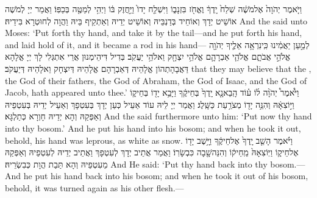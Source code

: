 {וַיֹּ֤אמֶר יְהֹוָה֙ אֶל\maqqaf מֹשֶׁ֔ה שְׁלַח֙ יָֽדְךָ֔ וֶאֱחֹ֖ז בִּזְנָב֑וֹ וַיִּשְׁלַ֤ח יָדוֹ֙ וַיַּ֣חֲזֶק בּ֔וֹ וַיְהִ֥י לְמַטֶּ֖ה בְּכַפּֽוֹ׃}
{וַאֲמַר יְיָ לְמֹשֶׁה אוֹשֵׁיט יְדָךְ וְאוֹחֵיד בְּדַנְבֵּיהּ וְאוֹשֵׁיט יְדֵיהּ וְאַתְקֵיף בֵּיהּ וַהֲוָה לְחוּטְרָא בִּידֵיהּ׃}
{And the \lord\space said unto Moses: ‘Put forth thy hand, and take it by the tail—and he put forth his hand, and laid hold of it, and it became a rod in his hand—}{}
{לְמַ֣עַן יַאֲמִ֔ינוּ כִּֽי\maqqaf נִרְאָ֥ה אֵלֶ֛יךָ יְהֹוָ֖ה אֱלֹהֵ֣י אֲבֹתָ֑ם אֱלֹהֵ֧י אַבְרָהָ֛ם אֱלֹהֵ֥י יִצְחָ֖ק וֵאלֹהֵ֥י יַעֲקֹֽב׃}
{בְּדִיל דִּיהֵימְנוּן אֲרֵי אִתְגְּלִי לָךְ יְיָ אֱלָהָא דַּאֲבָהָתְהוֹן אֱלָהֵיהּ דְּאַבְרָהָם אֱלָהֵיהּ דְּיִצְחָק וֵאלָהֵיהּ דְּיַעֲקֹב׃}
{that they may believe that the \lord, the God of their fathers, the God of Abraham, the God of Isaac, and the God of Jacob, hath appeared unto thee.’}{}
{וַיֹּ֩אמֶר֩ יְהֹוָ֨ה ל֜וֹ ע֗וֹד הָֽבֵא\maqqaf נָ֤א יָֽדְךָ֙ בְּחֵיקֶ֔ךָ וַיָּבֵ֥א יָד֖וֹ בְּחֵיק֑וֹ וַיּ֣וֹצִאָ֔הּ וְהִנֵּ֥ה יָד֖וֹ מְצֹרַ֥עַת כַּשָּֽׁלֶג׃}
{וַאֲמַר יְיָ לֵיהּ עוֹד אַעֵיל כְּעַן יְדָךְ בְּעִטְפָךְ וְאַעֵיל יְדֵיהּ בְּעִטְפֵיהּ וְאַפְּקַהּ וְהָא יְדֵיהּ חָוְרָא כְּתַלְגָּא׃}
{And the \lord\space said furthermore unto him: ‘Put now thy hand into thy bosom.’ And he put his hand into his bosom; and when he took it out, behold, his hand was leprous, as white as snow.}{}
{וַיֹּ֗אמֶר הָשֵׁ֤ב יָֽדְךָ֙ אֶל\maqqaf חֵיקֶ֔ךָ וַיָּ֥שֶׁב יָד֖וֹ אֶל\maqqaf חֵיק֑וֹ וַיּֽוֹצִאָהּ֙ מֵֽחֵיק֔וֹ וְהִנֵּה\maqqaf שָׁ֖בָה כִּבְשָׂרֽוֹ׃}
{וַאֲמַר אֲתֵיב יְדָךְ לְעִטְפָךְ וַאֲתֵיב יְדֵיהּ לְעִטְפֵיהּ וְאַפְּקַהּ מֵעִטְפֵיהּ וְהָא תַּבַת הֲוָת כְּבִשְׂרֵיהּ׃}
{And He said: ‘Put thy hand back into thy bosom.—And he put his hand back into his bosom; and when he took it out of his bosom, behold, it was turned again as his other flesh.—}{}
